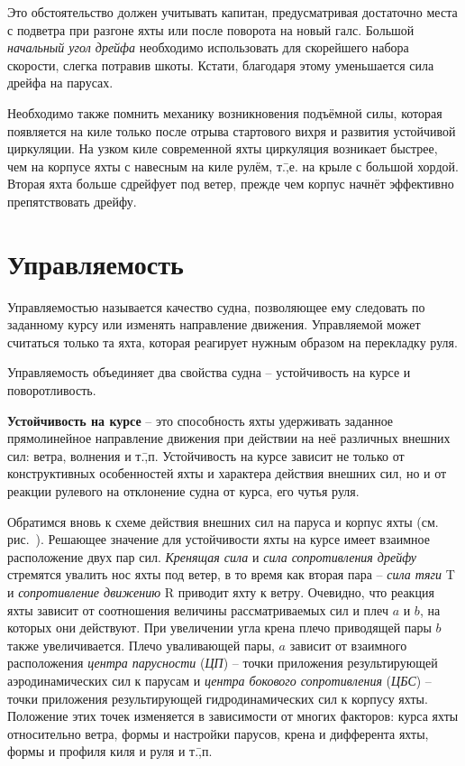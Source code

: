 Это обстоятельство должен учитывать капитан, предусматривая достаточно
места с подветра при разгоне яхты или после поворота на новый
галс. Большой \textit{начальный угол дрейфа}
необходимо использовать для скорейшего набора скорости, слегка
потравив шкоты. Кстати, благодаря этому уменьшается сила дрейфа на
парусах.

Необходимо также помнить механику возникновения подъёмной силы,
которая появляется на киле только после отрыва стартового вихря и
развития устойчивой циркуляции. На узком киле современной яхты
циркуляция возникает быстрее, чем на корпусе яхты с навесным на киле
рулём, т.\=,е. на крыле с большой хордой. Вторая яхта больше сдрейфует
под ветер, прежде чем корпус начнёт эффективно препятствовать дрейфу.

\section{Управляемость}

Управляемостью называется качество судна, позволяющее ему следовать по
заданному курсу или изменять направление движения. Управляемой может
считаться только та яхта, которая реагирует нужным образом на
перекладку руля.

Управляемость объединяет два свойства судна \--- устойчивость на курсе
и поворотливость.

\textbf{Устойчивость на курсе} \--- это
способность яхты удерживать заданное прямолинейное направление
движения при действии на неё различных внешних сил: ветра, волнения и
т.\=,п. Устойчивость на курсе зависит не только от конструктивных
особенностей яхты и характера действия внешних сил, но и от реакции
рулевого на отклонение судна от курса, его чутья руля.

Обратимся вновь к схеме действия внешних сил на паруса и корпус яхты
(см. рис.~). Решающее значение для устойчивости яхты на курсе
имеет взаимное расположение двух пар сил. \textit{Кренящая сила}
 и \textit{сила сопротивления дрейфу}
 стремятся увалить нос
яхты под ветер, в то время как вторая пара \--- \textit{сила тяги} \ve
T и \textit{сопротивление движению} \ve
R приводит яхту к ветру. Очевидно,
что реакция яхты зависит от соотношения величины рассматриваемых сил и
плеч $a$ и $b$, на которых они действуют. При увеличении угла крена
плечо приводящей пары $b$ также увеличивается. Плечо уваливающей пары,
$a$ зависит от взаимного расположения \textit{центра парусности} (\textit{ЦП})
\--- точки приложения результирующей аэродинамических сил к парусам и
\textit{центра бокового сопротивления} (\textit{ЦБС})
\--- точки приложения результирующей гидродинамических сил к корпусу яхты. Положение этих
точек изменяется в зависимости от многих факторов: курса яхты
относительно ветра, формы и настройки парусов, крена и дифферента
яхты, формы и профиля киля и руля и т.\=,п.

